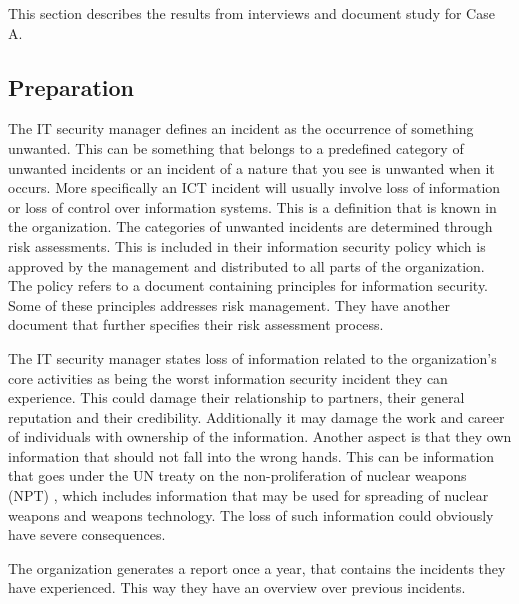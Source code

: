 This section describes the results from interviews and document study for Case A. 

\subsection{Preparation}
The IT security manager defines an incident %
as the occurrence of something unwanted. This can be something that belongs to a predefined category of unwanted incidents or an incident of a nature that you see is unwanted when it occurs. More specifically an \ac{ICT} incident will usually involve loss of information or loss of control over information systems. This is a definition that is known in the organization. The categories of unwanted incidents are determined through risk assessments. This is included in their information security policy which is approved by the management and distributed to all parts of the organization. The policy refers to a document containing principles for information security. Some of these principles addresses risk management. They have another document that further specifies their risk assessment process. %

The IT security manager states loss of information related to the organization's core activities as being the worst information security incident they can experience. This could damage their relationship to partners, their general reputation and their credibility. Additionally it may damage the work and career of individuals with ownership of the information. %
Another aspect is that they own information that should not fall into the wrong hands. This can be information that goes under the \ac{UN} treaty on the non-proliferation of nuclear weapons (NPT) \cite{NPT}, which includes information that may be used for spreading of nuclear weapons and weapons technology. %
The loss of such information could obviously have severe consequences.

The organization generates a report once a year, that contains the incidents they have experienced. This way they have an overview over previous incidents.

